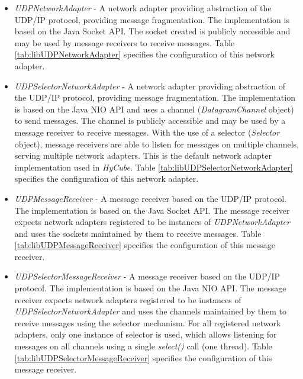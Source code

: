 \begin{itemize}
	\renewcommand{\labelitemi}{$\bullet$}
	
	\item \emph{UDPNetworkAdapter} - A network adapter providing abstraction of the UDP/IP protocol, providing message fragmentation. The implementation is based on the Java Socket API. The socket created is publicly accessible and may be used by message receivers to receive messages. Table \ref{tab:libUDPNetworkAdapter} specifies the configuration of this network adapter.
	
	\item \emph{UDPSelectorNetworkAdapter} - A network adapter providing abstraction of the UDP/IP protocol, providing message fragmentation. The implementation is based on the Java NIO API and uses a channel (\emph{DatagramChannel} object) to send messages. The channel is publicly accessible and may be used by a message receiver to receive messages. With the use of a selector (\emph{Selector} object), message receivers are able to listen for messages on multiple channels, serving multiple network adapters. This is the default network adapter implementation used in \emph{HyCube}. Table \ref{tab:libUDPSelectorNetworkAdapter} specifies the configuration of this network adapter.
	
	
	\item \emph{UDPMessageReceiver} - A message receiver based on the UDP/IP protocol. The implementation is based on the Java Socket API. The message receiver expects network adapters registered to be instances of \emph{UDPNetworkAdapter} and uses the sockets maintained by them to receive messages. Table \ref{tab:libUDPMessageReceiver} specifies the configuration of this message receiver.
	
	\item \emph{UDPSelectorMessageReceiver} - A message receiver based on the UDP/IP protocol. The implementation is based on the Java NIO API. The message receiver expects network adapters registered to be instances of \emph{UDPSelectorNetworkAdapter} and uses the channels maintained by them to receive messages using the selector mechanism. For all registered network adapters, only one instance of selector is used, which allows listening for messages on all channels using a single \emph{select()} call (one thread). Table \ref{tab:libUDPSelectorMessageReceiver} specifies the configuration of this message receiver.
	

\end{itemize}
